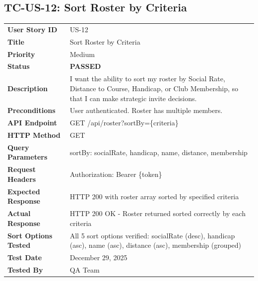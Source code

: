 \documentclass[11pt,a4paper]{article}
\newcommand{\passed}{\textcolor{pass}{\textbf{PASSED}}}
\begin{document}
\vspace{0.5cm}


\subsection{TC-US-12: Sort Roster by Criteria}

\begin{tabularx}{\textwidth}{|p{3.2cm}|Y|}
\hline
{}
 \\
\hline
\textbf{User Story ID} & US-12 \\
\hline
\textbf{Title} & Sort Roster by Criteria \\
\hline
\textbf{Priority} & Medium \\
\hline
\textbf{Status} & \passed \\
\hline
\textbf{Description} & I want the ability to sort my roster by Social Rate, Distance to Course, Handicap, or Club Membership, so that I can make strategic invite decisions. \\
\hline
\textbf{Preconditions} & User authenticated. Roster has multiple members. \\
\hline
\textbf{API Endpoint} & GET /api/roster?sortBy=\{criteria\} \\
\hline
\textbf{HTTP Method} & GET \\
\hline
\textbf{Query Parameters} & sortBy: socialRate, handicap, name, distance, membership \\
\hline
\textbf{Request Headers} & Authorization: Bearer \{token\} \\
\hline
\textbf{Expected Response} & HTTP 200 with roster array sorted by specified criteria \\
\hline
\textbf{Actual Response} & HTTP 200 OK - Roster returned sorted correctly by each criteria \\
\hline
\textbf{Sort Options Tested} & All 5 sort options verified: socialRate (desc), handicap (asc), name (asc), distance (asc), membership (grouped) \\
\hline
\textbf{Test Date} & December 29, 2025 \\
\hline
\textbf{Tested By} & QA Team \\
\hline
\end{tabularx}
\end{document}
